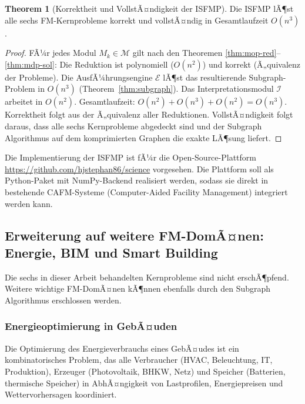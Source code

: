 ﻿\documentclass[a4paper,12pt]{article}
\theoremstyle{definition}
\newtheorem{theorem}{Theorem}[section]
\begin{document}
\begin{theorem}[Korrektheit und VollstÃ¤ndigkeit der ISFMP]
\label{thm:isfmp}
Die ISFMP lÃ¶st alle sechs FM-Kernprobleme korrekt und vollstÃ¤ndig in
Gesamtlaufzeit $O(n^3)$.
\end{theorem}

\begin{proof}
FÃ¼r jedes Modul $M_k \in \mathcal{M}$ gilt nach den Theoremen
\ref{thm:mop-red}--\ref{thm:mdp-sol}: Die Reduktion ist polynomiell ($O(n^2)$)
und korrekt (Ã„quivalenz der Probleme). Die AusfÃ¼hrungsengine $\mathcal{E}$ lÃ¶st
das resultierende Subgraph-Problem in $O(n^3)$ (Theorem~\ref{thm:subgraph}).
Das Interpretationsmodul $\mathcal{I}$ arbeitet in $O(n^2)$.
Gesamtlaufzeit: $O(n^2) + O(n^3) + O(n^2) = O(n^3)$.
Korrektheit folgt aus der Ã„quivalenz aller Reduktionen.
VollstÃ¤ndigkeit folgt daraus, dass alle sechs Kernprobleme abgedeckt sind
und der Subgraph Algorithmus auf dem komprimierten Graphen die exakte LÃ¶sung liefert.
\end{proof}

Die Implementierung der ISFMP ist fÃ¼r die Open-Source-Plattform
\url{https://github.com/hjstephan86/science} vorgesehen.
Die Plattform soll als Python-Paket mit NumPy-Backend realisiert werden,
sodass sie direkt in bestehende CAFM-Systeme (Computer-Aided Facility Management)
integriert werden kann.

\subsection{Erweiterung auf weitere FM-DomÃ¤nen: Energie, BIM und Smart Building}

Die sechs in dieser Arbeit behandelten Kernprobleme sind nicht erschÃ¶pfend.
Weitere wichtige FM-DomÃ¤nen kÃ¶nnen ebenfalls durch den Subgraph Algorithmus
erschlossen werden.

\subsubsection{Energieoptimierung in GebÃ¤uden}

Die Optimierung des Energieverbrauchs eines GebÃ¤udes ist ein kombinatorisches
Problem, das alle Verbraucher (HVAC, Beleuchtung, IT, Produktion), Erzeuger
(Photovoltaik, BHKW, Netz) und Speicher (Batterien, thermische Speicher)
in AbhÃ¤ngigkeit von Lastprofilen, Energiepreisen und Wettervorhersagen
koordiniert.
\end{document}
